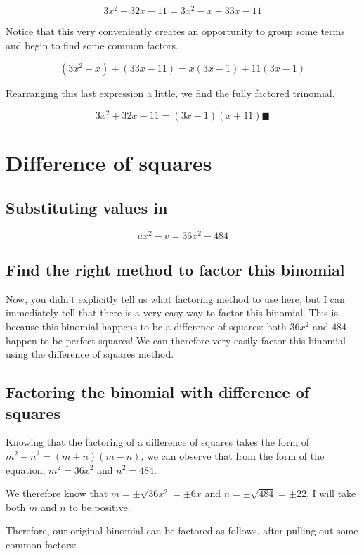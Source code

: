\documentclass[12pt]{article}
\begin{document}
\[
3x^2 + 32x - 11 = 3x^2 - x + 33x - 11
\]

Notice that this very conveniently creates an opportunity to group some terms and begin to find some common factors.

\[
(3x^2 - x) + (33x - 11) = x(3x - 1) + 11(3x - 1)
\]

Rearranging this last expression a little, we find the fully factored trinomial.

\[
3x^2 + 32x - 11 = (3x - 1)(x + 11)\blacksquare
\]

\newpage

\section{Difference of squares}

\subsection{Substituting values in}

\[
ux^2 - v = 36x^2 - 484
\]

\subsection{Find the right method to factor this binomial}

Now, you didn't explicitly tell us what factoring method to use here, but I can immediately tell that there is a very easy way to factor this binomial.
This is because this binomial happens to be a difference of squares: both $36x^2$ and $484$ happen to be perfect squares! We can therefore very easily factor this binomial using the difference of squares method.

\subsection{Factoring the binomial with difference of squares}

Knowing that the factoring of a difference of squares takes the form of $m^2 - n^2 = (m+n)(m-n)$, we can observe that from the form of the equation, $m^2 = 36x^2$ and $n^2 = 484$.

We therefore know that $m = \pm \sqrt{36x^2} = \pm 6x$ and $n = \pm \sqrt{484} = \pm 22$.
I will take both $m$ and $n$ to be positive.

Therefore, our original binomial can be factored as follows, after pulling out some common factors: 
\end{document}
